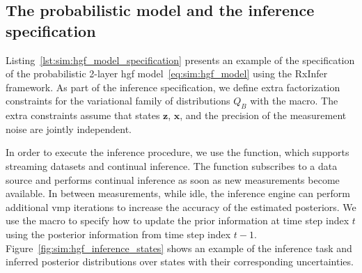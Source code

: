 \subsection{The probabilistic model and the inference specification}
\begin{figure*}
  \begin{adjustbox}{minipage=\textwidth,margin=0pt \smallskipamount,center}
  \end{adjustbox}
\end{figure*}
Listing~\ref{lst:sim:hgf_model_specification} presents an example of the specification of the probabilistic 2-layer \ac{hgf} model~\eqref{eq:sim:hgf_model} using the RxInfer framework.
As part of the inference specification, we define extra factorization constraints for the
variational family of distributions $Q_{B}$ with the  macro.
The extra constraints assume that states $\bm{z}$, $\bm{x}$, and the precision of the
measurement noise are jointly independent.
\begin{figure*}
  \begin{adjustbox}{minipage=\textwidth,margin=0pt \smallskipamount,center}
  \end{adjustbox}
\end{figure*}
In order to execute the inference procedure, we use the  function, which
supports streaming datasets and continual inference.
The  function subscribes to a data source and performs continual
inference as soon as new measurements become available.
In between measurements, while idle, the inference engine can perform additional \ac{vmp} iterations to
increase the accuracy of the estimated posteriors.
We use the  macro to specify how to update the prior information at time
step index $t$ using the posterior information from time step index $t - 1$.
Figure~\ref{fig:sim:hgf_inference_states} shows an example of the inference task and inferred
posterior distributions over states with their corresponding uncertainties.
